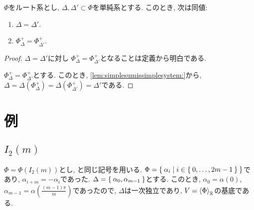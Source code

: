 \begin{theorem}
  $\Phi$をルート系とし,
  $\Delta,\Delta'\subset \Phi$を単純系とする.
  このとき, 次は同値:
  \begin{enumerate}
  \item $\Delta=\Delta'$.
  \item $\Phi_\Delta^+=\Phi_{\Delta'}^+$.
  \end{enumerate}
\end{theorem}
\begin{proof}
  $\Delta=\Delta'$に対し
  $\Phi_\Delta^+=\Phi_{\Delta'}^+$となることは定義から明白である.

  $\Phi_\Delta^+=\Phi_{\Delta'}^+$とする.
  このとき,
  \cref{lem:simplesumissimplesystem:}から,
  $\Delta=\Delta(\Phi_\Delta^+)=\Delta(\Phi_{\Delta'}^+)=\Delta'$である.

\end{proof}

\section{例}

\subsection{$I_2(m)$}
\label{ex:i2m:simple}
$\Phi=\Phi(I_2(m))$とし,
と同じ記号を用いる.
$\Phi=\Set{\alpha_i|i\in\Set{0,\ldots,2m-1}}$であり, $\alpha_{i+m}=-\alpha_i$であった.
$\Delta=\Set{\alpha_0,\alpha_{m-1}}$とする.
このとき,
$\alpha_{0}=\alpha(0)$, $\alpha_{m-1}=\alpha\left(\frac{(m-1)\pi}{m}\right)$であったので,
$\Delta$は一次独立であり, $V=\Braket{\Phi}_{\mathbb{R}}$の基底である.

